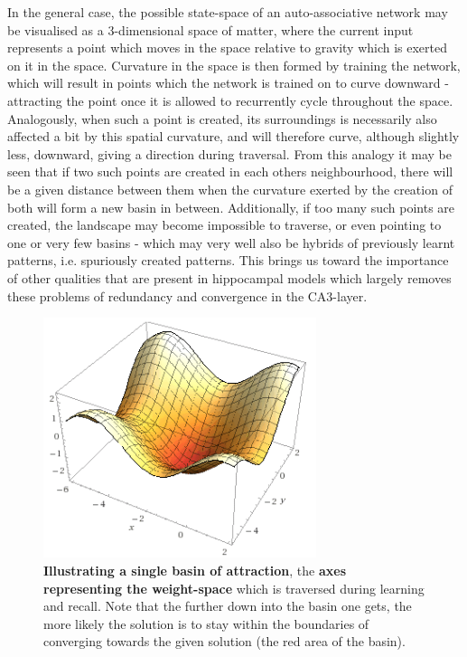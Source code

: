 In the general case, the possible state-space of an auto-associative network may be visualised as a 3-dimensional space of matter, where the current input represents a point which moves in the space relative to gravity which is exerted on it in the space. Curvature in the space is then formed by training the network, which will result in points which the network is trained on to curve downward - attracting the point once it is allowed to recurrently cycle throughout the space. Analogously, when such a point is created, its surroundings is necessarily also affected a bit by this spatial curvature, and will therefore curve, although slightly less, downward, giving a direction during traversal. From this analogy it may be seen that if two such points are created in each others neighbourhood, there will be a given distance between them when the curvature exerted by the creation of both will form a new basin in between. Additionally, if too many such points are created, the landscape may become impossible to traverse, or even pointing to one or very few basins - which may very well also be hybrids of previously learnt patterns, i.e. spuriously created patterns.
This brings us toward the importance of other qualities that are present in hippocampal models which largely removes these problems of redundancy and convergence in the CA3-layer.

\begin{figure}
    \centering
    \includegraphics[width=8cm]{fig/simple-basin.png}
    \caption{\textbf{Illustrating a single basin of attraction}, the \textbf{axes representing the weight-space} which is traversed during learning and recall. Note that the further down into the basin one gets, the more likely the solution is to stay within the boundaries of converging towards the given solution (the red area of the basin).}
    \label{fig:simple-basin}
\end{figure}

